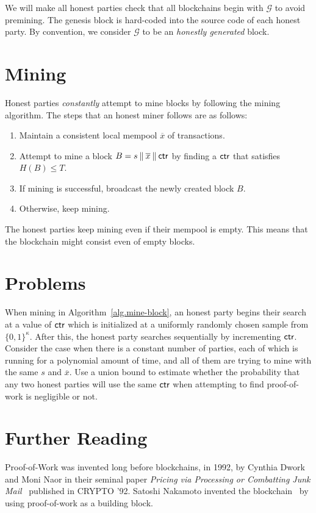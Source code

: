 We will make all honest parties check that all blockchains begin with $\mathcal{G}$ to avoid
premining. The genesis block is hard-coded into the source code of each honest party. By
convention, we consider $\mathcal{G}$ to be an \emph{honestly generated} block.

\section{Mining}

Honest parties \emph{constantly} attempt to mine blocks by following the mining algorithm.
The steps that an honest miner follows are as follows:

\begin{enumerate}
  \item Maintain a consistent local mempool $\overline{x}$ of transactions.
  \item Attempt to mine a block $B = s \mathbin{\|} \overline{x} \mathbin{\|} \mathsf{ctr}$ by finding a $\mathsf{ctr}$ that satisfies $H(B) \leq T$.
  \item If mining is successful, broadcast the newly created block $B$.
  \item Otherwise, keep mining.
\end{enumerate}

The honest parties keep mining even if their mempool is empty. This means that the blockchain
might consist even of empty blocks.

\section*{Problems}

\begin{problems}
  \item When mining in Algorithm~\ref{alg.mine-block}, an honest party begins their search at a
        value of $\mathsf{ctr}$ which is initialized at a uniformly randomly chosen sample from $\{0, 1\}^\kappa$.
        After this, the honest party searches sequentially by incrementing $\mathsf{ctr}$.
        Consider the case when there is a constant number of parties, each of which is running for a
        polynomial amount of time, and all of them are trying to mine with the same $s$ and $\overline{x}$.
        Use a union bound to estimate whether the probability that any two honest parties will use
        the same $\mathsf{ctr}$ when attempting to find proof-of-work is negligible or not.
\end{problems}

\section*{Further Reading}

Proof-of-Work was invented long before blockchains, in 1992, by Cynthia Dwork and Moni Naor
in their seminal paper \emph{Pricing via Processing or Combatting Junk Mail}~\cite{pow} published
in CRYPTO '92. Satoshi Nakamoto invented the blockchain~\cite{bitcoin} by using proof-of-work as a
building block.
